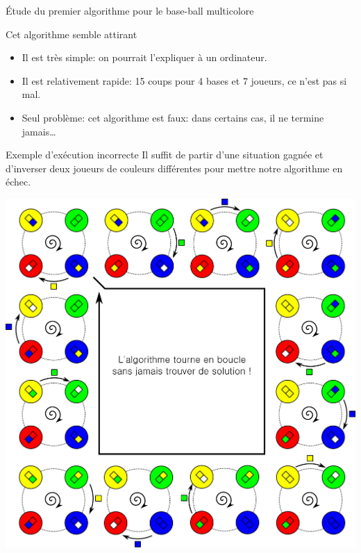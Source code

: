 \begin{frame}{Étude du premier algorithme pour le base-ball multicolore}
  \begin{block}{Cet algorithme semble attirant}
    \begin{itemize}
    \item Il est très simple: on pourrait l'expliquer à un ordinateur.
    \item Il est relativement rapide: 15 coups pour 4 bases et 7 joueurs, ce n'est pas si mal.
    \item Seul problème: cet algorithme est faux: dans certains cas, il ne termine jamais\ldots
    \end{itemize}
  \end{block}

  \begin{block}{Exemple d'exécution incorrecte}
    Il suffit de partir d'une situation gagnée et d'inverser deux joueurs de couleurs différentes pour mettre notre algorithme en échec.
\end{block}
  \begin{center}
    \includegraphics[width=0.7\linewidth]{img/baseball_ex2.pdf}
  \end{center}
\end{frame}

